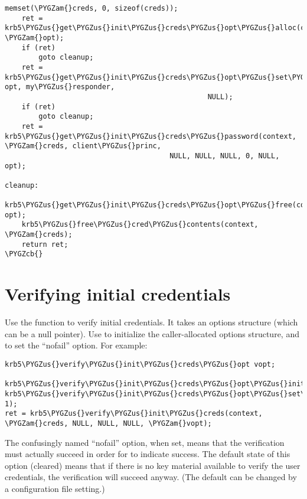 \documentclass[letterpaper,10pt,english]{sphinxmanual}
\def\PYGZus{\char`\_}
\def\PYGZcb{\char`\}}
\def\PYGZam{\char`\&}
\begin{document}
\begin{Verbatim}[commandchars=\\\{\}]
    memset(\PYGZam{}creds, 0, sizeof(creds));
    ret = krb5\PYGZus{}get\PYGZus{}init\PYGZus{}creds\PYGZus{}opt\PYGZus{}alloc(context, \PYGZam{}opt);
    if (ret)
        goto cleanup;
    ret = krb5\PYGZus{}get\PYGZus{}init\PYGZus{}creds\PYGZus{}opt\PYGZus{}set\PYGZus{}responder(context, opt, my\PYGZus{}responder,
                                                NULL);
    if (ret)
        goto cleanup;
    ret = krb5\PYGZus{}get\PYGZus{}init\PYGZus{}creds\PYGZus{}password(context, \PYGZam{}creds, client\PYGZus{}princ,
                                       NULL, NULL, NULL, 0, NULL, opt);

cleanup:
    krb5\PYGZus{}get\PYGZus{}init\PYGZus{}creds\PYGZus{}opt\PYGZus{}free(context, opt);
    krb5\PYGZus{}free\PYGZus{}cred\PYGZus{}contents(context, \PYGZam{}creds);
    return ret;
\PYGZcb{}
\end{Verbatim}


\section{Verifying initial credentials}
\label{appdev/init_creds:verifying-initial-credentials}
Use the function {\hyperref[appdev/refs/api/krb5_verify_init_creds:c.krb5_verify_init_creds]{}} to verify initial
credentials.  It takes an options structure (which can be a null
pointer).  Use {\hyperref[appdev/refs/api/krb5_verify_init_creds_opt_init:c.krb5_verify_init_creds_opt_init]{}} to initialize
the caller-allocated options structure, and
{\hyperref[appdev/refs/api/krb5_verify_init_creds_opt_set_ap_req_nofail:c.krb5_verify_init_creds_opt_set_ap_req_nofail]{}} to set the
``nofail'' option.  For example:

\begin{Verbatim}[commandchars=\\\{\}]
krb5\PYGZus{}verify\PYGZus{}init\PYGZus{}creds\PYGZus{}opt vopt;

krb5\PYGZus{}verify\PYGZus{}init\PYGZus{}creds\PYGZus{}opt\PYGZus{}init(\PYGZam{}vopt);
krb5\PYGZus{}verify\PYGZus{}init\PYGZus{}creds\PYGZus{}opt\PYGZus{}set\PYGZus{}ap\PYGZus{}req\PYGZus{}nofail(\PYGZam{}vopt, 1);
ret = krb5\PYGZus{}verify\PYGZus{}init\PYGZus{}creds(context, \PYGZam{}creds, NULL, NULL, NULL, \PYGZam{}vopt);
\end{Verbatim}

The confusingly named ``nofail'' option, when set, means that the
verification must actually succeed in order for
{\hyperref[appdev/refs/api/krb5_verify_init_creds:c.krb5_verify_init_creds]{}} to indicate success.  The default
state of this option (cleared) means that if there is no key material
available to verify the user credentials, the verification will
succeed anyway.  (The default can be changed by a configuration file
setting.)
\end{document}
